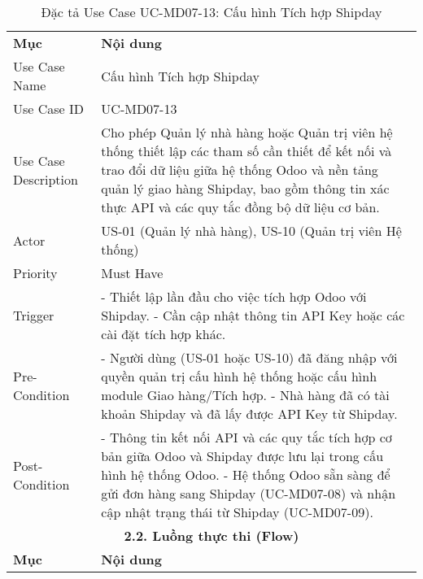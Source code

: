 \begin{longtable}{|m{4cm}|p{11cm}|}
\caption{Đặc tả Use Case UC-MD07-13: Cấu hình Tích hợp Shipday} \label{tab:uc_md07_13} \\
\hline

\endhead %
\hline
\endfoot %
\hline
\endlastfoot %
\multicolumn{2}{|c|}{\textbf{2.1. Tóm tắt (Summary)}} \\
\hline
\textbf{Mục} & \textbf{Nội dung} \\
\hline
Use Case Name & Cấu hình Tích hợp Shipday \\
\hline
Use Case ID & UC-MD07-13 \\
\hline
Use Case Description & Cho phép Quản lý nhà hàng hoặc Quản trị viên hệ thống thiết lập các tham số cần thiết để kết nối và trao đổi dữ liệu giữa hệ thống Odoo và nền tảng quản lý giao hàng Shipday, bao gồm thông tin xác thực API và các quy tắc đồng bộ dữ liệu cơ bản. \\
\hline
Actor & US-01 (Quản lý nhà hàng), US-10 (Quản trị viên Hệ thống) \\
\hline
Priority & Must Have \\
\hline
Trigger & - Thiết lập lần đầu cho việc tích hợp Odoo với Shipday. \newline - Cần cập nhật thông tin API Key hoặc các cài đặt tích hợp khác. \\
\hline
Pre-Condition & - Người dùng (US-01 hoặc US-10) đã đăng nhập với quyền quản trị cấu hình hệ thống hoặc cấu hình module Giao hàng/Tích hợp. \newline - Nhà hàng đã có tài khoản Shipday và đã lấy được API Key từ Shipday. \\
\hline
Post-Condition & - Thông tin kết nối API và các quy tắc tích hợp cơ bản giữa Odoo và Shipday được lưu lại trong cấu hình hệ thống Odoo. \newline - Hệ thống Odoo sẵn sàng để gửi đơn hàng sang Shipday (UC-MD07-08) và nhận cập nhật trạng thái từ Shipday (UC-MD07-09). \\
\hline
\multicolumn{2}{|c|}{\textbf{2.2. Luồng thực thi (Flow)}} \\
\hline
\textbf{Mục} & \textbf{Nội dung} \\
\hline

\end{longtable}

